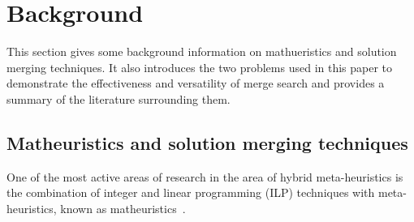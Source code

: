 \documentclass[journal]{IEEEtran}
\begin{document}


\section{Background}\label{sec:back}
This section gives some background information on mathueristics and solution merging techniques.
It also introduces the two problems used in this paper to demonstrate the effectiveness and versatility of merge search and provides a summary of the literature surrounding them.

\subsection{Matheuristics and solution merging techniques}
One of the most active areas of research in the area of hybrid meta-heuristics is the combination of integer and linear programming (ILP) techniques with meta-heuristics, known as matheuristics~\cite{matheuristics}.  
\end{document}

